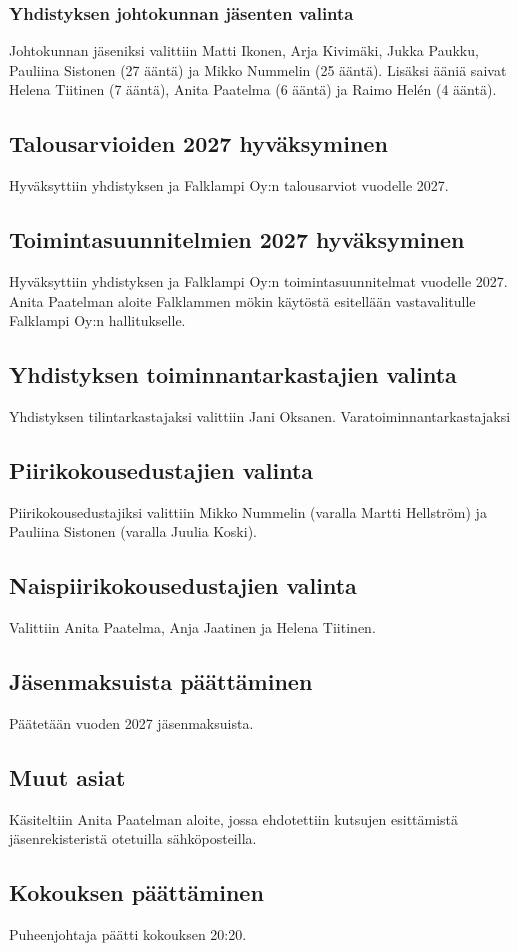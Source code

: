 \documentclass[a4paper,12pt]{article}
\begin{document}
\subsubsection{Yhdistyksen johtokunnan jäsenten valinta}
Johtokunnan jäseniksi valittiin Matti Ikonen, Arja Kivimäki, Jukka Paukku, Pauliina Sistonen (27 ääntä) ja Mikko Nummelin (25 ääntä). Lisäksi ääniä saivat Helena Tiitinen (7 ääntä), Anita Paatelma (6 ääntä) ja Raimo Helén (4 ääntä).
\subsection{Talousarvioiden 2027 hyväksyminen}
Hyväksyttiin yhdistyksen ja Falklampi Oy:n talousarviot vuodelle 2027.
\subsection{Toimintasuunnitelmien 2027 hyväksyminen}
Hyväksyttiin yhdistyksen ja Falklampi Oy:n toimintasuunnitelmat vuodelle 2027. Anita Paatelman aloite Falklammen mökin käytöstä esitellään vastavalitulle Falklampi Oy:n hallitukselle.
\subsection{Yhdistyksen toiminnantarkastajien valinta}
Yhdistyksen tilintarkastajaksi valittiin Jani Oksanen. Varatoiminnantarkastajaksi 
\subsection{Piirikokousedustajien valinta}
Piirikokousedustajiksi valittiin Mikko Nummelin (varalla Martti Hellström) ja Pauliina Sistonen (varalla Juulia Koski). 
\subsection{Naispiirikokousedustajien valinta}
Valittiin Anita Paatelma, Anja Jaatinen ja Helena Tiitinen.
\subsection{Jäsenmaksuista päättäminen}
Päätetään vuoden 2027 jäsenmaksuista.
\subsection{Muut asiat}
Käsiteltiin Anita Paatelman aloite, jossa ehdotettiin kutsujen esittämistä jäsenrekisteristä otetuilla sähköposteilla.
\subsection{Kokouksen päättäminen}
Puheenjohtaja päätti kokouksen 20:20.
\end{document}
